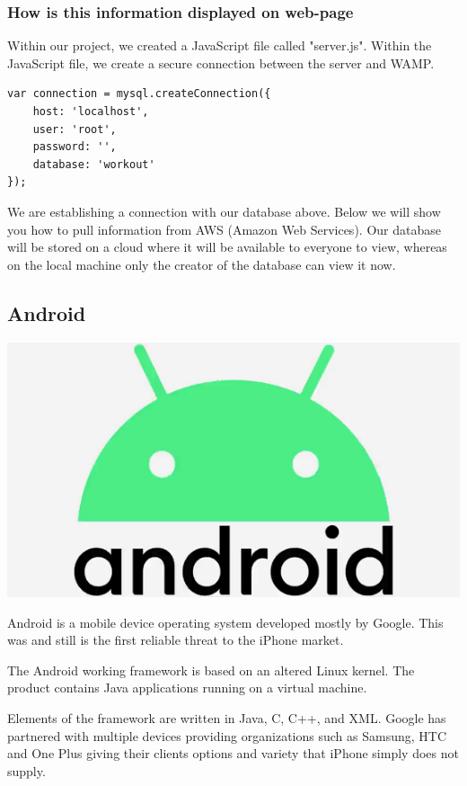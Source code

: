 \documentclass[a4paper,12pt]{report}
\begin{document}
\subsubsection{How is this information displayed on web-page}
Within our project, we created a JavaScript file called "server.js". Within the JavaScript file, we create a secure connection between the server and WAMP.
\begin{verbatim}
var connection = mysql.createConnection({
    host: 'localhost',
    user: 'root',
    password: '',
    database: 'workout'
});
\end{verbatim}
We are establishing a connection with our database above. Below we will show you how to pull information from AWS (Amazon Web Services). Our database will be stored on a cloud where it will be available to everyone to view, whereas on the local machine only the creator of the database can view it now.

\subsection{Android}
\includegraphics[scale=.1]{images/android.png}

Android is a mobile device operating system developed mostly by Google. This was and still is the first reliable threat to the iPhone market.

The Android working framework is based on an altered Linux kernel. The product contains Java applications running on a virtual machine.

Elements of the framework are written in Java, C, C++, and XML.
Google has partnered with multiple devices providing organizations such as Samsung, HTC and One Plus giving their clients options and variety that iPhone simply does not supply.\cite{butler2010android}
\end{document}
